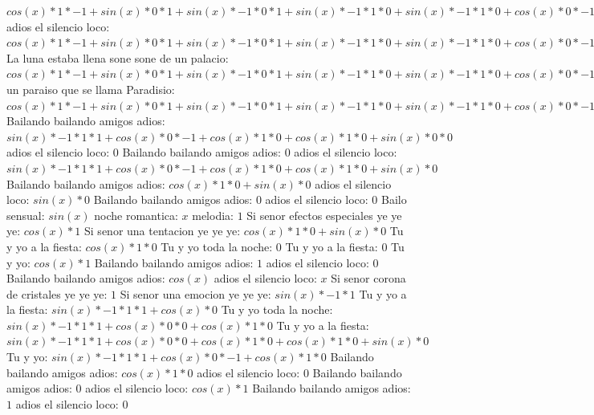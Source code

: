 \documentclass{article}
\begin{document}
${{{cos(x)*1*-1+sin(x)*0}*1+sin(x)*-1*0}*1+sin(x)*-1*1*0+sin(x)*-1*1*0+cos(x)*0}*-1+{sin(x)*-1*1*1+cos(x)*0}*0+{sin(x)*-1*1*1+cos(x)*0}*0+cos(x)*1*0+{sin(x)*-1*1*1+cos(x)*0}*0+cos(x)*1*0+cos(x)*1*0+sin(x)*0$ adios el silencio loco: ${{{{cos(x)*1*-1+sin(x)*0}*1+sin(x)*-1*0}*1+sin(x)*-1*1*0+sin(x)*-1*1*0+cos(x)*0}*-1+{sin(x)*-1*1*1+cos(x)*0}*0+{sin(x)*-1*1*1+cos(x)*0}*0+cos(x)*1*0+{sin(x)*-1*1*1+cos(x)*0}*0+cos(x)*1*0+cos(x)*1*0+sin(x)*0}*0+{{sin(x)*-1*1*1+cos(x)*0}*-1+cos(x)*1*0+cos(x)*1*0+sin(x)*0}*0$ La luna estaba llena sone sone de un palacio: ${{{{cos(x)*1*-1+sin(x)*0}*1+sin(x)*-1*0}*1+sin(x)*-1*1*0+sin(x)*-1*1*0+cos(x)*0}*-1+{sin(x)*-1*1*1+cos(x)*0}*0+{sin(x)*-1*1*1+cos(x)*0}*0+cos(x)*1*0+{sin(x)*-1*1*1+cos(x)*0}*0+cos(x)*1*0+cos(x)*1*0+sin(x)*0}*0+{{sin(x)*-1*1*1+cos(x)*0}*-1+cos(x)*1*0+cos(x)*1*0+sin(x)*0}*0+{{sin(x)*-1*1*1+cos(x)*0}*-1+cos(x)*1*0+cos(x)*1*0+sin(x)*0}*0+{cos(x)*1*-1+sin(x)*0}*0$ un paraiso que se llama Paradisio: ${{{{cos(x)*1*-1+sin(x)*0}*1+sin(x)*-1*0}*1+sin(x)*-1*1*0+sin(x)*-1*1*0+cos(x)*0}*-1+{sin(x)*-1*1*1+cos(x)*0}*0+{sin(x)*-1*1*1+cos(x)*0}*0+cos(x)*1*0+{sin(x)*-1*1*1+cos(x)*0}*0+cos(x)*1*0+cos(x)*1*0+sin(x)*0}*1+{{sin(x)*-1*1*1+cos(x)*0}*-1+cos(x)*1*0+cos(x)*1*0+sin(x)*0}*0$  \newline Bailando bailando amigos adios: ${{sin(x)*-1*1*1+cos(x)*0}*-1+cos(x)*1*0+cos(x)*1*0+sin(x)*0}*0$ adios el silencio loco: $0$ Bailando bailando amigos adios: $0$  \newline adios el silencio loco: ${sin(x)*-1*1*1+cos(x)*0}*-1+cos(x)*1*0+cos(x)*1*0+sin(x)*0$  \newline Bailando bailando amigos adios: $cos(x)*1*0+sin(x)*0$  \newline adios el silencio loco: $sin(x)*0$ Bailando bailando amigos adios: $0$ adios el silencio loco: $0$  \newline Bailo sensual: $sin(x)$  \newline noche romantica: $x$ melodia: $1$  \newline Si senor efectos especiales ye ye ye: $cos(x)*1$ Si senor una tentacion ye ye ye: $cos(x)*1*0+sin(x)*0$ Tu y yo a la fiesta: $cos(x)*1*0$ Tu y yo toda la noche: $0$ Tu y yo a la fiesta: $0$  \newline Tu y yo: $cos(x)*1$ Bailando bailando amigos adios: $1$ adios el silencio loco: $0$  \newline Bailando bailando amigos adios: $cos(x)$  \newline adios el silencio loco: $x$ Si senor corona de cristales ye ye ye: $1$  \newline Si senor una emocion ye ye ye: $sin(x)*-1*1$ Tu y yo a la fiesta: $sin(x)*-1*1*1+cos(x)*0$ Tu y yo toda la noche: ${sin(x)*-1*1*1+cos(x)*0}*0+cos(x)*1*0$ Tu y yo a la fiesta: ${sin(x)*-1*1*1+cos(x)*0}*0+cos(x)*1*0+cos(x)*1*0+sin(x)*0$ Tu y yo: ${sin(x)*-1*1*1+cos(x)*0}*-1+cos(x)*1*0$  \newline Bailando bailando amigos adios: $cos(x)*1*0$ adios el silencio loco: $0$ Bailando bailando amigos adios: $0$  \newline adios el silencio loco: $cos(x)*1$ Bailando bailando amigos adios: $1$ adios el silencio loco: $0$  
\end{document}
